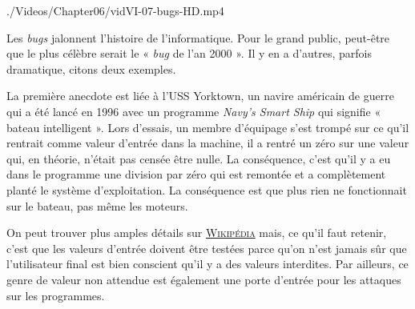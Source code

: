\begin{marginvideo}
		{./Videos/Chapter06/vidVI-07-bugs-HD.mp4}%
\end{marginvideo}

Les \textit{bugs} jalonnent l'histoire de l'informatique. Pour le grand public, peut-être que le plus célèbre serait le « \textit{bug} de l'an 2000 ». Il y en a d'autres, parfois dramatique, citons deux exemples.

La première anecdote est liée à l'USS Yorktown, un navire américain de guerre qui a été lancé en 1996 avec un programme \textit{Navy's Smart Ship} qui signifie « bateau intelligent ». Lors d'essais, un membre d'équipage s'est trompé sur ce qu'il rentrait comme valeur d'entrée dans la machine, il a rentré un zéro sur une valeur qui, en théorie, n'était pas censée être nulle. La conséquence, c'est qu'il y a eu dans le programme une division par zéro qui est remontée et a complètement planté le système d'exploitation. La conséquence est que plus rien ne fonctionnait sur le bateau, pas même les moteurs.

On peut trouver plus amples détails sur \href{https://en.wikipedia.org/wiki/USS_Yorktown_(CG-48)}{\textsc{Wikipédia}} mais, ce qu'il faut retenir, c'est que les valeurs d'entrée doivent être testées parce qu'on n'est jamais sûr que l'utilisateur final est bien conscient qu'il y a des valeurs interdites. Par ailleurs, ce genre de valeur non attendue est également une porte d'entrée pour les attaques sur les programmes. 

